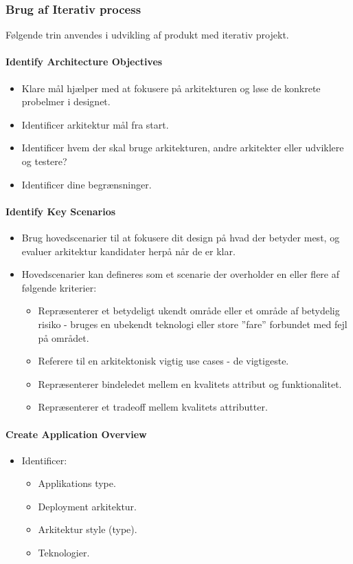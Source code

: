 \subsubsection{Brug af Iterativ process}\label{sec:arc_ite}
Følgende trin anvendes i udvikling af produkt med iterativ projekt.

\paragraph{Identify Architecture Objectives}
\begin{itemize}
	\item Klare mål hjælper med at fokusere på arkitekturen og løse de konkrete probelmer i designet.
	\item Identificer arkitektur mål fra start.
	\item Identificer hvem der skal bruge arkitekturen, andre arkitekter eller udviklere og testere?
	\item Identificer dine begrænsninger.
\end{itemize}

\paragraph{Identify Key Scenarios}
\begin{itemize}
	\item Brug hovedscenarier til at fokusere dit design på hvad der betyder mest, og evaluer arkitektur kandidater herpå når de er klar.
	\item Hovedscenarier kan defineres som et scenarie der overholder en eller flere af følgende kriterier:
	\begin{itemize}
		\item Repræsenterer et betydeligt ukendt område eller et område af betydelig risiko - bruges en ubekendt teknologi eller store ''fare'' forbundet med fejl på området.
		\item Referere til en arkitektonisk vigtig use cases - de vigtigeste.
		\item Repræsenterer bindeledet mellem en kvalitets attribut og funktionalitet.
		\item Repræsenterer et tradeoff mellem kvalitets attributter. 
	\end{itemize}
\end{itemize}

\paragraph{Create Application Overview}
\begin{itemize}
	\item Identificer:
	\begin{itemize}
		\item Applikations type.
		\item Deployment arkitektur. 
		\item Arkitektur style (type). 
		\item Teknologier. 
	\end{itemize}
\end{itemize}

